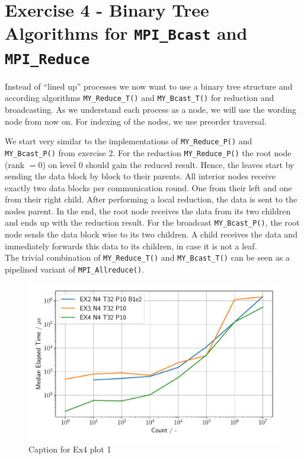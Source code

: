 \section{Exercise 4 - Binary Tree Algorithms for \texttt{MPI\_Bcast} and \texttt{MPI\_Reduce}}
Instead of “lined up” processes we now want to use a binary tree structure and according algorithms 
\texttt{MY\_Reduce\_T()} and \texttt{MY\_Bcast\_T()} for reduction and broadcasting. As we understand 
each process as a node, we will use the wording node from now on. For indexing of the nodes, we use preorder traversal.

We start very similar to the implementations of \texttt{MY\_Reduce\_P()} and \texttt{MY\_Bcast\_P()} 
from exercise 2. For the reduction \texttt{MY\_Reduce\_P()}  the root node (rank $=0$) on level 0 should 
gain the reduced result. Hence, the leaves start by sending the data block by block to their parents. All 
interior nodes receive exactly two data blocks per communication round. One from their left and one from their 
right child. After performing a local reduction, the data is sent to the nodes parent. In the end, the root 
node receives the data from its two children and ends up with the reduction result. For the broadcast 
\texttt{MY\_Bcast\_P()}, the root node sends the data block wise to its two children. A child receives 
the data and immediately forwards this data to its children, in case it is not a leaf.\\

The trivial combination of \texttt{MY\_Reduce\_T()} and \texttt{MY\_Bcast\_T()} can be seen 
as a pipelined variant of \texttt{MPI\_Allreduce()}.\\

\begin{figure}[h]
    \begin{center}
        \includegraphics[width=1.0\linewidth]{figures/Ex4_1.pdf}
        \caption{Caption for Ex4 plot 1}
        \label{Ex4_1_p}
    \end{center}
\end{figure}

